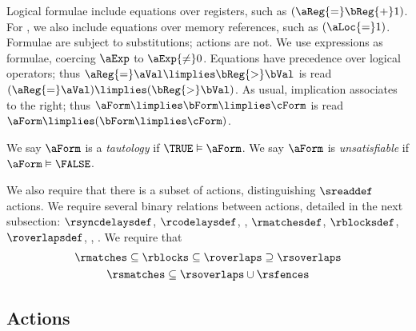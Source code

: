 Logical formulae include equations over registers, such as
$(\aReg{=}\bReg{+}1)$.  For \xLIR{}, we also include equations over memory
references, such as $(\aLoc{=}1)$.  Formulae are subject to substitutions;
actions are not.  We use expressions as formulae, coercing $\aExp$ to
$\aExp{\neq}0$.  Equations have precedence over logical operators; thus
$\aReg{=}\aVal\limplies\bReg{>}\bVal$ is read
$(\aReg{=}\aVal)\limplies(\bReg{>}\bVal)$.  As usual, implication associates
to the right; thus $\aForm\limplies\bForm\limplies\cForm$ is read
$\aForm\limplies(\bForm\limplies\cForm)$.

We say
$\aForm$ is a \emph{tautology} if $\TRUE\vDash\aForm$.
We say
$\aForm$ is \emph{unsatisfiable} if $\aForm\vDash\FALSE$.



We also require that there is a subset of actions, distinguishing
$\sreaddef$ %
actions. 
We require several binary relations between actions, detailed in the next
subsection: 
$\rsyncdelaysdef$,
$\rcodelaysdef$,
\rsmatchesdeftext, 
$\rmatchesdef$, 
$\rblocksdef$, 
$\roverlapsdef$, 
\rsoverlapsdeftext,
\rsfencesdeftext.
We require that
\begin{gather*}
  {\rmatches}\subseteq {\rblocks}\subseteq {\roverlaps}
  \supseteq{\rsoverlaps}
  \\
  {\rsmatches}\subseteq {\rsoverlaps}\cup{\rsfences}
\end{gather*}


\subsection{Actions}
\label{sec:actions}


